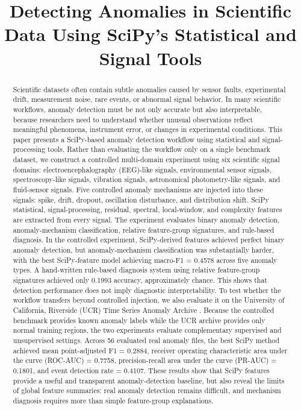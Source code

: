 \title{Detecting Anomalies in Scientific Data Using SciPy's Statistical and Signal Tools}

\begin{abstract}
Scientific datasets often contain subtle anomalies caused by sensor faults,
experimental drift, measurement noise, rare events, or abnormal signal behavior.
In many scientific workflows, anomaly detection must be not only accurate but also
interpretable, because researchers need to understand whether unusual observations
reflect meaningful phenomena, instrument error, or changes in experimental
conditions. This paper presents a SciPy-based anomaly detection workflow using
statistical and signal-processing tools. Rather than evaluating the workflow only
on a single benchmark dataset, we construct a controlled multi-domain experiment
using six scientific signal domains: electroencephalography (EEG)-like signals,
environmental sensor signals, spectroscopy-like signals, vibration signals,
astronomical photometry-like signals, and fluid-sensor signals. Five controlled
anomaly mechanisms are injected into these signals: spike, drift, dropout,
oscillation disturbance, and distribution shift. SciPy statistical,
signal-processing, residual, spectral, local-window, and complexity features are
extracted from every signal. The experiment evaluates binary anomaly detection,
anomaly-mechanism classification, relative feature-group signatures, and
rule-based diagnosis. In the controlled experiment, SciPy-derived features
achieved perfect binary anomaly detection, but anomaly-mechanism classification
was substantially harder, with the best SciPy-feature model achieving macro-F1 =
0.4578 across five anomaly types. A hand-written rule-based diagnosis system using
relative feature-group signatures achieved only 0.1993 accuracy, approximately
chance. This shows that detection performance does not imply diagnostic
interpretability. To test whether the workflow transfers beyond controlled
injection, we also evaluate it on the University of California, Riverside (UCR)
Time Series Anomaly Archive \citep{wu2021ucr}. Because the controlled benchmark
provides known anomaly labels while the UCR archive provides only normal training
regions, the two experiments evaluate complementary supervised and unsupervised
settings. Across 56 evaluated real anomaly files, the best SciPy method achieved
mean point-adjusted F1 = 0.2884, receiver operating characteristic area under the
curve (ROC-AUC) = 0.7758, precision-recall area under the curve (PR-AUC) = 0.1801,
and event detection rate = 0.4107. These results show that SciPy features provide a useful
and transparent anomaly-detection baseline, but also reveal the limits of global
feature summaries: real anomaly detection remains difficult, and mechanism
diagnosis requires more than simple feature-group explanations.
\end{abstract}


